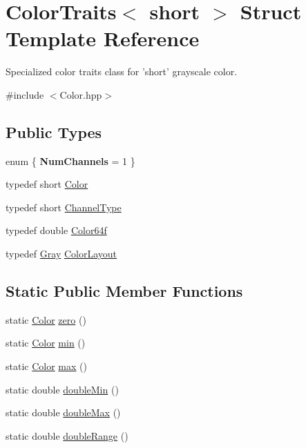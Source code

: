 \hypertarget{struct_d_o_1_1_color_traits_3_01short_01_4}{\section{Color\-Traits$<$ short $>$ Struct Template Reference}
\label{struct_d_o_1_1_color_traits_3_01short_01_4}
}


Specialized color traits class for 'short' grayscale color.  




{\ttfamily \#include $<$Color.\-hpp$>$}

\subsection*{Public Types}
\begin{DoxyCompactItemize}
\item 
enum \{ {\bfseries Num\-Channels} = 1
 \}
\item 
typedef short \hyperlink{struct_d_o_1_1_color_traits_3_01short_01_4_a8dd4714eb3b4cc636650b4efa78c8319}{Color}
\item 
typedef short \hyperlink{struct_d_o_1_1_color_traits_3_01short_01_4_a28c32afba2b462baca0f47d477ccf9e2}{Channel\-Type}
\item 
typedef double \hyperlink{struct_d_o_1_1_color_traits_3_01short_01_4_a9a301fd8ba0a7225e38351d3e5b2e4d3}{Color64f}
\item 
typedef \hyperlink{struct_d_o_1_1_gray}{Gray} \hyperlink{struct_d_o_1_1_color_traits_3_01short_01_4_a7c9d599cfa0d1404784fbe60e6bcfd24}{Color\-Layout}
\end{DoxyCompactItemize}
\subsection*{Static Public Member Functions}
\begin{DoxyCompactItemize}
\item 
static \hyperlink{struct_d_o_1_1_color_traits_3_01short_01_4_a8dd4714eb3b4cc636650b4efa78c8319}{Color} \hyperlink{struct_d_o_1_1_color_traits_3_01short_01_4_a57b00f8db42515f404e06ab933932125}{zero} ()
\item 
static \hyperlink{struct_d_o_1_1_color_traits_3_01short_01_4_a8dd4714eb3b4cc636650b4efa78c8319}{Color} \hyperlink{struct_d_o_1_1_color_traits_3_01short_01_4_a1cd81f912af766f8004e4d5a82a7128b}{min} ()
\item 
static \hyperlink{struct_d_o_1_1_color_traits_3_01short_01_4_a8dd4714eb3b4cc636650b4efa78c8319}{Color} \hyperlink{struct_d_o_1_1_color_traits_3_01short_01_4_aded391d5e231096e135e08760c0fbeb6}{max} ()
\item 
static double \hyperlink{struct_d_o_1_1_color_traits_3_01short_01_4_aa122aba748bfd453a27d2c30b368dbc3}{double\-Min} ()
\item 
static double \hyperlink{struct_d_o_1_1_color_traits_3_01short_01_4_ab9fb6b1bb12e23b725453a69f6193c30}{double\-Max} ()
\item 
static double \hyperlink{struct_d_o_1_1_color_traits_3_01short_01_4_aed64f95e634b8dac0ae5a0aed2b45740}{double\-Range} ()
\end{DoxyCompactItemize}


